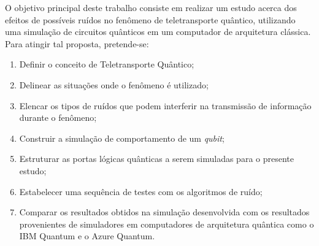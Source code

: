 \documentclass[11pt,oneside,brazil,hidelinks,article,sumario=tradicional,a4paper]{abntex2}
\begin{document}
O objetivo principal deste trabalho consiste em realizar um estudo acerca dos efeitos de possíveis ruídos no fenômeno de teletransporte quântico, utilizando uma simulação de circuitos quânticos em um computador de arquitetura clássica. Para atingir tal proposta, pretende-se:
\begin{enumerate}
\item Definir o conceito de Teletransporte Quântico;
\item Delinear as situações onde o fenômeno é utilizado;
\item Elencar os tipos de ruídos que podem interferir na transmissão de informação durante o fenômeno;
\item Construir a simulação de comportamento de um \textit{qubit};
\item Estruturar as portas lógicas quânticas a serem simuladas para o presente estudo;
\item Estabelecer uma sequência de testes com os algoritmos de ruído;
\item Comparar os resultados obtidos na simulação desenvolvida com os resultados provenientes de simuladores em computadores de arquitetura quântica como o IBM Quantum e o Azure Quantum.
\end{enumerate} 







\end{document}
